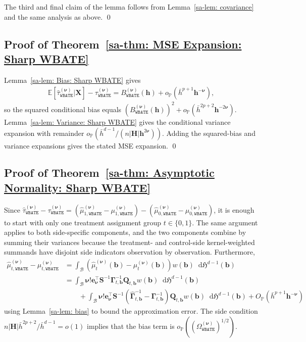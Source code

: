 \documentclass[10pt]{article}
\renewcommand{\P}{\mathbb{P}}
\newcommand{\E}{\mathbb{E}}
\newcommand{\Haus}{\mathfrak{H}}
\newcommand{\dif}{\mathop{}\!\mathrm{d}}
\newcommand{\bb}{\mathbf{b}}
\newcommand{\be}{\mathbf{e}}
\newcommand{\bh}{\mathbf{h}}
\newcommand{\bH}{\mathbf{H}}
\newcommand{\bQ}{\mathbf{Q}}
\newcommand{\bS}{\mathbf{S}}
\newcommand{\bX}{\mathbf{X}}
\newcommand{\bnu}{\boldsymbol{\nu}}
\newcommand{\bGamma}{\boldsymbol{\Gamma}}
\newcommand{\B}{\mathcal{B}}
\begin{document}
The third and final claim of the lemma follows from Lemma~\ref{sa-lem: covariance} and the same analysis as above.
\qed

\subsection{Proof of Theorem~\ref{sa-thm: MSE Expansion: Sharp WBATE}}

Lemma~\ref{sa-lem: Bias: Sharp WBATE} gives
\begin{align*}
    \E[\widehat{\tau}_{\mathtt{WBATE}}^{(\bnu)}|\bX]-\tau_{\mathtt{WBATE}}^{(\bnu)}
    = B_{\mathtt{WBATE}}^{(\bnu)}(\bh)+o_{\P}(\bar{h}^{p+1}\bh^{-\bnu}),
\end{align*}
so the squared conditional bias equals $(B_{\mathtt{WBATE}}^{(\bnu)}(\bh))^2+o_{\P}(\bar{h}^{2p+2}\bh^{-2\bnu})$. Lemma~\ref{sa-lem: Variance: Sharp WBATE} gives the conditional variance expansion with remainder $o_{\P}(\bar{h}^{d-1}/(n|\bH|\bh^{2\bnu}))$. Adding the squared-bias and variance expansions gives the stated MSE expansion.
\qed

\subsection{Proof of Theorem~\ref{sa-thm: Asymptotic Normality: Sharp WBATE}}

Since $\widehat{\tau}_{\mathtt{WBATE}}^{(\bnu)} - \tau_{\mathtt{WBATE}}^{(\bnu)} = (\widehat{\mu}_{1,\mathtt{WBATE}}^{(\bnu)} - \mu_{1,\mathtt{WBATE}}^{(\bnu)}) - (\widehat{\mu}_{0,\mathtt{WBATE}}^{(\bnu)} - \mu_{0,\mathtt{WBATE}}^{(\bnu)})$, it is enough to start with only one treatment assignment group $t \in \{0,1\}$. The same argument applies to both side-specific components, and the two components combine by summing their variances because the treatment- and control-side kernel-weighted summands have disjoint side indicators observation by observation. Furthermore,
\begin{align*}
    \widehat{\mu}_{t,\mathtt{WBATE}}^{(\bnu)} - \mu_{t,\mathtt{WBATE}}^{(\bnu)}
    &= \int_{\B} (\widehat{\mu}^{(\bnu)}_{t}(\bb) - \mu^{(\bnu)}_t(\bb) ) w(\bb) \dif\Haus^{d-1}(\bb)\\
    &= \int_{\B} \bnu!\be_{\bnu}^{\top}\bS^{-1} \bGamma_{t,\bb}^{-1} \bQ_{t,\bb} w(\bb) \dif\Haus^{d-1}(\bb)\\
    &\qquad  + \int_{\B} \bnu!\be_{\bnu}^{\top}\bS^{-1}(\widehat{\bGamma}_{t,\bb}^{-1} - \bGamma_{t,\bb}^{-1}) \bQ_{t,\bb} w(\bb) \dif\Haus^{d-1}(\bb)
      + O_\P(\bar{h}^{p+1}\bh^{-\bnu})
\end{align*}
using Lemma~\ref{sa-lem: bias} to bound the approximation error.
The side condition $n|\bH|\bar{h}^{2p+2}/\bar{h}^{d-1}=o(1)$ implies that the bias term is $o_{\P}((\Omega_{\mathtt{WBATE}}^{(\bnu)})^{1/2})$.
\end{document}
